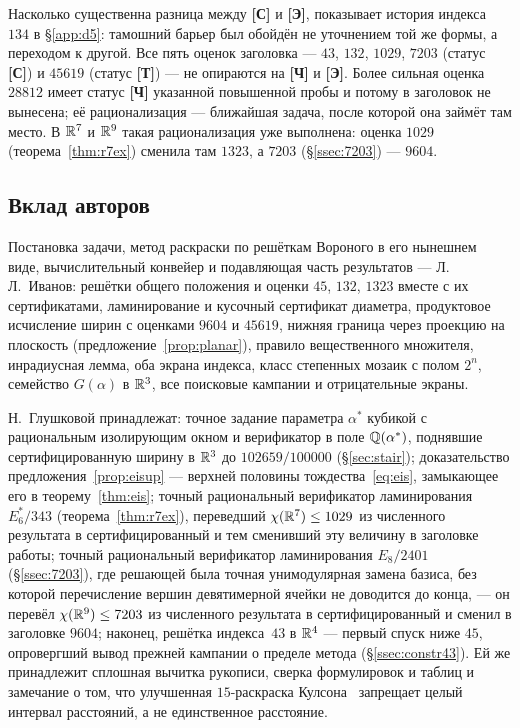 Насколько существенна разница между \textbf{[С]} и \textbf{[Э]}, показывает
история индекса~$134$ в \S\ref{app:d5}: тамошний барьер был обойдён не
уточнением той же формы, а переходом к другой. Все пять оценок заголовка --- $43$, $132$, $1029$, $7203$
(статус \textbf{[С]}) и $45619$ (статус \textbf{[Т]}) --- не
опираются на \textbf{[Ч]} и \textbf{[Э]}. Более сильная оценка
$28812$ имеет статус \textbf{[Ч]} указанной повышенной пробы и
потому в заголовок не вынесена; её рационализация --- ближайшая задача,
после которой она займёт там место. В $\mathbb{R}^7$ и $\mathbb{R}^9$ такая рационализация
уже выполнена: оценка $1029$ (теорема~\ref{thm:r7ex}) сменила там $1323$, а
$7203$ (\S\ref{ssec:7203}) --- $9604$.

\subsection{Вклад авторов}\label{ssec:contrib}

Постановка задачи, метод раскраски по решёткам Вороного в его нынешнем виде,
вычислительный конвейер и подавляющая часть результатов --- Л.\,Л.~Иванов:
решётки общего положения и оценки $45$, $132$, $1323$ вместе с их
сертификатами, ламинирование и кусочный сертификат диаметра, продуктовое
исчисление ширин с оценками $9604$ и $45619$, нижняя граница через проекцию на плоскость
(предложение~\ref{prop:planar}), правило вещественного множителя, инрадиусная
лемма, оба экрана индекса, класс степенных мозаик с полом $2^n$, семейство
$G(\alpha)$ в $\mathbb{R}^3$, все поисковые кампании и отрицательные экраны.

Н.~Глушковой принадлежат: точное задание параметра $\alpha^*$ кубикой с
рациональным изолирующим окном и верификатор в поле $\mathbb{Q}(\alpha^*)$, поднявшие
сертифицированную ширину в $\mathbb{R}^3$ до $102659/100000$ (\S\ref{sec:stair});
доказательство предложения~\ref{prop:eisup} --- верхней половины
тождества~\eqref{eq:eis}, замыкающее его в теорему~\ref{thm:eis}; точный
рациональный верификатор ламинирования $E_6^*/343$
(теорема~\ref{thm:r7ex}), переведший $\chi(\mathbb{R}^7)\le1029$ из численного
результата в сертифицированный и тем сменивший эту величину в заголовке
работы; точный рациональный верификатор ламинирования $E_8/2401$
(\S\ref{ssec:7203}), где решающей была точная унимодулярная замена базиса,
без которой перечисление вершин девятимерной ячейки не доводится до конца,
--- он перевёл $\chi(\mathbb{R}^9)\le7203$ из численного результата в
сертифицированный и сменил в заголовке $9604$; наконец, решётка индекса~$43$ в $\mathbb{R}^4$ --- первый спуск ниже $45$,
опровергший вывод прежней кампании о пределе метода
(\S\ref{ssec:constr43}). Ей же принадлежит сплошная вычитка рукописи, сверка
формулировок и таблиц и замечание о том, что улучшенная $15$-раскраска
Кулсона~\cite{Coulson} запрещает целый интервал расстояний, а не единственное
расстояние.

